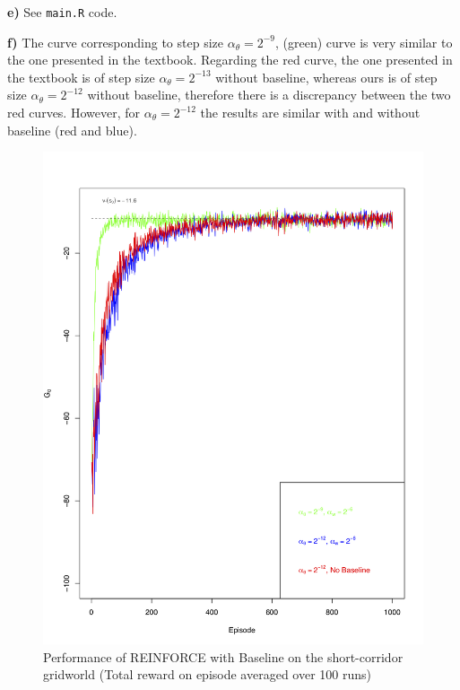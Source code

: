 \documentclass[a4paper,12pt]{article}
\def\code#1{\texttt{#1}}
\begin{document}
\newpage

\textbf{e)} See \code{main.R} code.

\textbf{f)} The curve corresponding to step size $\alpha_{\theta} = 2^{-9}$, (green) curve is very similar to the one presented in the textbook. Regarding the red curve, the one presented in the textbook is of step size $\alpha_{\theta} = 2^{-13}$ without baseline, whereas ours is of step size $\alpha_{\theta} = 2^{-12}$ without baseline, therefore there is a discrepancy between the two red curves. However, for $\alpha_{\theta} = 2^{-12}$ the results are similar with and without baseline (red and blue). 

\begin{figure}[H]
  \caption{Performance of REINFORCE with Baseline on the short-corridor gridworld (Total reward on episode averaged over 100 runs)}
  \centering
  \includegraphics[width=15cm]{figures/2f.png}
\end{figure}
\end{document}
